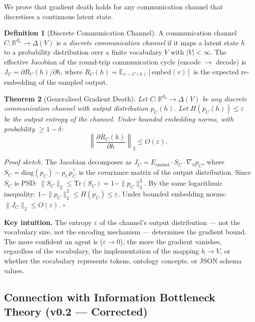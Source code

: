 \documentclass[11pt,a4paper]{article}
\theoremstyle{plain}
\newtheorem{theorem}{Theorem}[section]
\theoremstyle{definition}
\newtheorem{definition}[theorem]{Definition}
\theoremstyle{remark}
\newcommand{\Real}{\mathbb{R}}
\begin{document}
We prove that gradient death holds for any communication channel that discretises
a continuous latent state.

\begin{definition}[Discrete Communication Channel]
A communication channel $C: \Real^{d_h} \to \Delta(V)$ is a \emph{discrete
communication channel} if it maps a latent state $h$ to a probability distribution
over a finite vocabulary $V$ with $|V| < \infty$. The effective Jacobian of the
round-trip communication cycle (encode $\to$ decode) is
$J_C = \partial R_C(h)/\partial h$,
where $R_C(h) = \mathbb{E}_{v \sim C(h)}[\text{embed}(v)]$ is the expected
re-embedding of the sampled output.
\end{definition}

\begin{keyresult}
\begin{theorem}[Generalised Gradient Death]
Let $C: \Real^{d_h} \to \Delta(V)$ be any discrete communication channel with
output distribution $p_C(h)$. Let $H(p_C(h)) \le \varepsilon$ be the output
entropy of the channel. Under bounded embedding norms, with probability
$\ge 1 - \delta$:
\[
  \left\|\frac{\partial R_C(h)}{\partial h}\right\|_2 \le O(\varepsilon).
\]
\end{theorem}
\end{keyresult}

\textit{Proof sketch.}
The Jacobian decomposes as $J_C = E_\text{embed} \cdot S_C \cdot \nabla_h p_C$,
where $S_C = \text{diag}(p_C) - p_C p_C^\top$ is the covariance matrix of the
output distribution. Since $S_C$ is PSD:
$\|S_C\|_2 \le \text{Tr}(S_C) = 1 - \|p_C\|_2^2$.
By the same logarithmic inequality: $1 - \|p_C\|_2^2 \le H(p_C) \le \varepsilon$.
Under bounded embedding norms: $\|J_C\|_2 \le O(\varepsilon)$. $\square$

\textbf{Key intuition.} The entropy $\varepsilon$ of the channel's output
distribution --- not the vocabulary size, not the encoding mechanism --- determines
the gradient bound. The more confident an agent is ($\varepsilon \to 0$), the more
the gradient vanishes, regardless of the vocabulary, the implementation of the
mapping $h \to V$, or whether the vocabulary represents tokens, ontology concepts,
or JSON schema values.

\subsection{Connection with Information Bottleneck Theory (v0.2 --- Corrected)}
\end{document}
